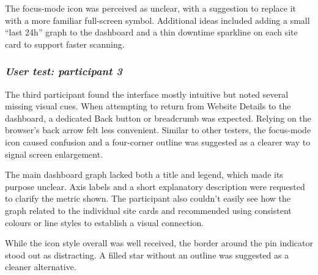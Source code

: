 The focus-mode icon was perceived as unclear, with a suggestion to replace it with a more familiar full-screen symbol. Additional ideas included adding a small “last 24h” graph to the dashboard and a thin downtime sparkline on each site card to support faster scanning.


\subsubsection{\textit{\textbf{User test: participant 3}}}

The third participant found the interface mostly intuitive but noted several missing visual cues. When attempting to return from Website Details to the dashboard, a dedicated Back button or breadcrumb was expected. Relying on the browser’s back arrow felt less convenient. Similar to other testers, the focus-mode icon caused confusion and a four-corner outline was suggested as a clearer way to signal screen enlargement.

The main dashboard graph lacked both a title and legend, which made its purpose unclear. Axis labels and a short explanatory description were requested to clarify the metric shown. The participant also couldn’t easily see how the graph related to the individual site cards and recommended using consistent colours or line styles to establish a visual connection.

While the icon style overall was well received, the border around the pin indicator stood out as distracting. A filled star without an outline was suggested as a cleaner alternative.
